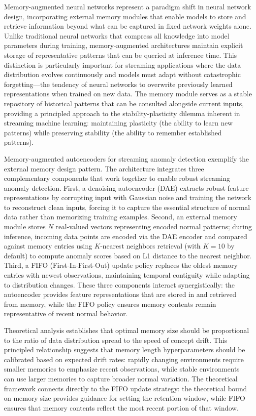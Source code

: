Memory-augmented neural networks represent a paradigm shift in neural network design, incorporating external memory modules that enable models to store and retrieve information beyond what can be captured in fixed network weights alone. Unlike traditional neural networks that compress all knowledge into model parameters during training, memory-augmented architectures maintain explicit storage of representative patterns that can be queried at inference time. This distinction is particularly important for streaming applications where the data distribution evolves continuously and models must adapt without catastrophic forgetting---the tendency of neural networks to overwrite previously learned representations when trained on new data. The memory module serves as a stable repository of historical patterns that can be consulted alongside current inputs, providing a principled approach to the stability-plasticity dilemma inherent in streaming machine learning: maintaining plasticity (the ability to learn new patterns) while preserving stability (the ability to remember established patterns).

Memory-augmented autoencoders for streaming anomaly detection exemplify the external memory design pattern. The architecture integrates three complementary components that work together to enable robust streaming anomaly detection. First, a denoising autoencoder (DAE) extracts robust feature representations by corrupting input with Gaussian noise and training the network to reconstruct clean inputs, forcing it to capture the essential structure of normal data rather than memorizing training examples. Second, an external memory module stores $N$ real-valued vectors representing encoded normal patterns; during inference, incoming data points are encoded via the DAE encoder and compared against memory entries using $K$-nearest neighbors retrieval (with $K=10$ by default) to compute anomaly scores based on L1 distance to the nearest neighbor. Third, a FIFO (First-In-First-Out) update policy replaces the oldest memory entries with newest observations, maintaining temporal contiguity while adapting to distribution changes. These three components interact synergistically: the autoencoder provides feature representations that are stored in and retrieved from memory, while the FIFO policy ensures memory contents remain representative of recent normal behavior.

Theoretical analysis establishes that optimal memory size should be proportional to the ratio of data distribution spread to the speed of concept drift. This principled relationship suggests that memory length hyperparameters should be calibrated based on expected drift rates: rapidly changing environments require smaller memories to emphasize recent observations, while stable environments can use larger memories to capture broader normal variation. The theoretical framework connects directly to the FIFO update strategy: the theoretical bound on memory size provides guidance for setting the retention window, while FIFO ensures that memory contents reflect the most recent portion of that window.

